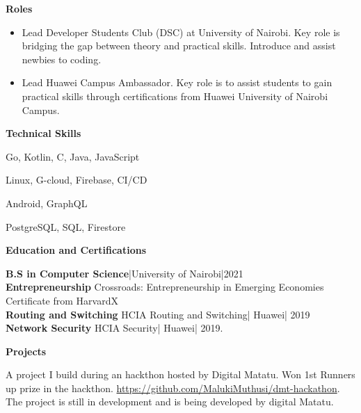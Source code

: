 \documentclass[a4paper]{article}
\begin{document}
\begin{center}
    {\Large \textbf{Roles}}
\end{center}
\begin{itemize}[noitemsep]
    \item Lead Developer Students Club (DSC) at University of Nairobi. Key role is bridging the gap between theory and practical skills. Introduce and assist newbies to coding.
    \item Lead Huawei Campus Ambassador. Key role is to assist students to gain practical skills through certifications from Huawei University of Nairobi Campus.
\end{itemize}

\begin{center}
    {\Large \textbf{Technical Skills}}
\end{center}
\begin{description}[noitemsep]
    \item[Languages:] Go, Kotlin, C, Java, JavaScript
    \item[Platforms and tools:] Linux, G-cloud, Firebase, CI/CD
    \item[Frameworks:] Android, GraphQL
    \item[Databases:] PostgreSQL, SQL, Firestore
\end{description}

\begin{center}
    {\Large \textbf{Education and Certifications}}
\end{center}
\textbf{B.S in Computer Science}|University of Nairobi|2021 \\
\textbf{Entrepreneurship} Crossroads: Entrepreneurship in Emerging Economies Certificate from HarvardX \\
\textbf{Routing and Switching} HCIA Routing and Switching| Huawei| 2019 \\
\textbf{Network Security} HCIA Security| Huawei| 2019. \par

\begin{center}
    {\Large \textbf{Projects} }
\end{center}
\begin{description}[noitemsep]
    \item[Digital Matatu Fare:] A project I build during an hackthon hosted by Digital Matatu. Won 1st Runners up prize in the hackthon. \url{ https://github.com/MalukiMuthusi/dmt-hackathon}. The project is still in development and is being developed by digital Matatu.
\end{description}
\end{document}

